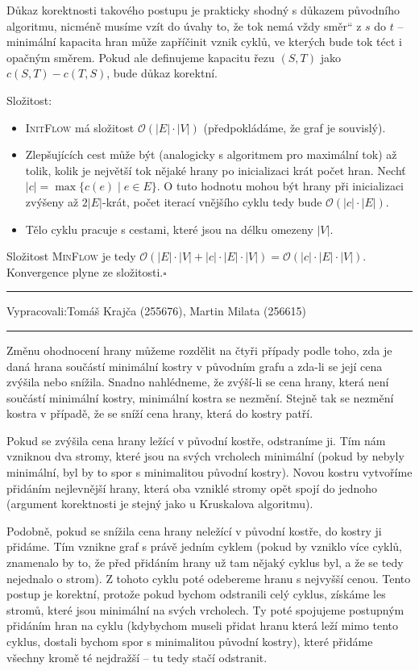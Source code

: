 \documentclass[12pt]{article}
\newcommand{\uv}[1]{\quotedblbase #1\textquotedblleft}
\renewcommand{\O}{\mathcal{O}}
\newcommand{\zadani}[2]{
{\large
\noindent {\bf IB108 \hfill{} Sada #1, Příklad #2 \\[-4mm]}
\noindent\hrule
\vspace{2mm}
\noindent Vypracovali:\hfill{}Tomáš Krajča (255676), Martin Milata (256615)
\vspace{3mm}
\hrule
\bigskip\bigskip}
}
\begin{document}
Důkaz korektnosti takového postupu je prakticky shodný s důkazem původního algoritmu, nicméně musíme
vzít do úvahy to, že tok nemá vždy \uv{směr} z $s$ do $t$ -- minimální kapacita hran může zapříčinit
vznik cyklů, ve kterých bude tok téct i opačným směrem. Pokud ale definujeme kapacitu řezu
$(S,T)$ jako $c(S,T) - c(T,S)$, bude důkaz korektní.

\noindent
Složitost:
\begin{itemize}
\item \textsc{InitFlow} má složitost $\O(|E|\cdot|V|)$ (předpokládáme, že graf je souvislý).
\item Zlepšujících cest může být (analogicky s algoritmem pro maximální tok) až tolik, kolik je
největší tok nějaké hrany po inicializaci krát počet hran.  Nechť $|c| = \max\{c(e) \mid e \in E\}$. O tuto hodnotu mohou být
hrany při inicializaci zvýšeny až $2|E|$-krát, počet iterací vnějšího cyklu tedy bude $\O(|c|\cdot|E|)$.
\item Tělo cyklu pracuje s cestami, které jsou na délku omezeny $|V|$.
\end{itemize}
Složitost \textsc{MinFlow} je tedy $\O(|E|\cdot|V| + |c|\cdot|E|\cdot|V|) =
\O(|c|\cdot|E|\cdot|V|)$. Konvergence plyne ze složitosti.\hfill$\square$



\clearpage
\zadani{3}{4}

\noindent
Změnu ohodnocení hrany můžeme rozdělit na čtyři případy podle toho, zda je daná hrana součástí
minimální kostry v původním grafu a zda-li se její cena zvýšila nebo snížila.  Snadno nahlédneme, že
zvýší-li se cena hrany, která není součástí minimální kostry, minimální kostra se nezmění. Stejně
tak se nezmění kostra v případě, že se sníží cena hrany, která do kostry patří.

Pokud se zvýšila cena hrany ležící v původní kostře, odstraníme ji. Tím nám vzniknou dva stromy,
které jsou na svých vrcholech minimální
(pokud by nebyly minimální, byl by to spor s minimalitou původní kostry). Novou kostru
vytvoříme přidáním nejlevnější hrany, která oba vzniklé stromy opět spojí do jednoho (argument
korektnosti je stejný jako u Kruskalova algoritmu).

Podobně, pokud se snížila cena hrany neležící v původní kostře, do kostry ji přidáme. Tím vznikne graf
s právě jedním cyklem (pokud by vzniklo více cyklů, znamenalo by to, že před přidáním hrany už tam nějaký
cyklus byl, a že se tedy nejednalo o strom). Z tohoto cyklu poté odebereme hranu s nejvyšší cenou. Tento
postup je korektní, protože pokud bychom odstranili celý cyklus, získáme les stromů, které jsou
minimální na svých vrcholech.
Ty poté spojujeme postupným přidáním hran na cyklu (kdybychom museli přidat hranu která leží mimo
tento cyklus, dostali bychom spor s minimalitou původní kostry), které přidáme všechny kromě té nejdražší
-- tu tedy stačí odstranit.
\end{document}
